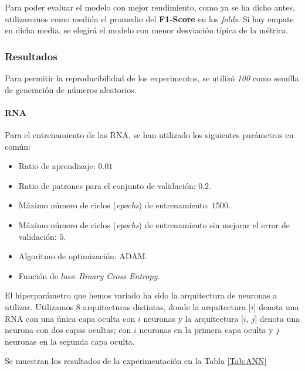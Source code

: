 \documentclass[12pt]{article}
\begin{document}
\bigskip
Para poder evaluar el modelo con mejor rendimiento, como ya se ha dicho antes, utilizaremos como medida el promedio
del \textbf{F1-Score} en los \textit{folds}. Si hay empate en dicha media, se elegirá el modelo con menor
desviación típica de la métrica.

\subsubsection{Resultados}
Para permitir la reproducibilidad de los experimentos, se utilizó \textit{100} como semilla de generación de números
aleatorios.

\paragraph{RNA}

Para el entrenamiento de las RNA, se han utilizado los siguientes parámetros en común:
\begin{itemize}
	\item Ratio de aprendizaje: $0.01$
	\item Ratio de patrones para el conjunto de validación: $0.2$.
	\item Máximo número de ciclos (\textit{epochs}) de entrenamiento: $1500$.
	\item Máximo número de ciclos (\textit{epochs}) de entrenamiento sin mejorar el error de validación: $5$.
	\item Algoritmo de optimización: ADAM.
	\item Función de \textit{loss}: \textit{Binary Cross Entropy}.
\end{itemize}
El hiperparámetro que hemos variado ha sido la arquitectura de neuronas a utilizar. Utilizamos 8 arquitecturas distintas,
donde la arquitectura [$i$] denota una RNA con una única capa oculta con $i$ neuronas y la arquitectura [$i$, $j$] 
denota una neurona con dos capas ocultas; con $i$ neuronas en la primera capa oculta y $j$ neuronas en la segunda capa oculta.

Se muestran los resultados de la experimentación en la Tabla \ref{Tab:ANN}
\end{document}
